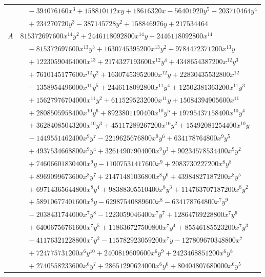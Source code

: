 \documentclass[11pt]{article}
\begin{document}
\begin{longtable}{@{}ll@{}}
 & $\quad -394076160x^{3}+158810112xy+18616320x-56401920y^{5}-203710464y^{4}$\\
 & $\quad +234270720y^{3}-387145728y^{2}+158846976y+217534464$\\
$A$ & $815372697600x^{14}y^{2}+2446118092800x^{14}y+2446118092800x^{14}$\\
 & $\quad -815372697600x^{13}y^{3}+1630745395200x^{13}y^{2}+9784472371200x^{13}y$\\
 & $\quad +12230590464000x^{13}+2174327193600x^{12}y^{4}+4348654387200x^{12}y^{3}$\\
 & $\quad +7610145177600x^{12}y^{2}+16307453952000x^{12}y+22830435532800x^{12}$\\
 & $\quad -1358954496000x^{11}y^{5}+2446118092800x^{11}y^{4}+12502381363200x^{11}y^{3}$\\
 & $\quad +15627976704000x^{11}y^{2}+6115295232000x^{11}y+15084394905600x^{11}$\\
 & $\quad +2808505958400x^{10}y^{6}+8923801190400x^{10}y^{5}+19795437158400x^{10}y^{4}$\\
 & $\quad +36284085043200x^{10}y^{3}+45117289267200x^{10}y^{2}+15492081254400x^{10}y$\\
 & $\quad -1449551462400x^{9}y^{7}-2219625676800x^{9}y^{6}+634178764800x^{9}y^{5}$\\
 & $\quad +4937534668800x^{9}y^{4}+32614907904000x^{9}y^{3}+90234578534400x^{9}y^{2}$\\
 & $\quad +74606601830400x^{9}y-11007531417600x^{9}+2083730227200x^{8}y^{8}$\\
 & $\quad +8969099673600x^{8}y^{7}+21471481036800x^{8}y^{6}+43984827187200x^{8}y^{5}$\\
 & $\quad +69714365644800x^{8}y^{4}+98388305510400x^{8}y^{3}+114763707187200x^{8}y^{2}$\\
 & $\quad +58910677401600x^{8}y-62987540889600x^{8}-634178764800x^{7}y^{9}$\\
 & $\quad -2038431744000x^{7}y^{8}-1223059046400x^{7}y^{7}+12864769228800x^{7}y^{6}$\\
 & $\quad +64006756761600x^{7}y^{5}+118636727500800x^{7}y^{4}+85546185523200x^{7}y^{3}$\\
 & $\quad -41176321228800x^{7}y^{2}-115782923059200x^{7}y-127809670348800x^{7}$\\
 & $\quad +724775731200x^{6}y^{10}+2400819609600x^{6}y^{9}+2423468851200x^{6}y^{8}$\\
 & $\quad +2740558233600x^{6}y^{7}+28651290624000x^{6}y^{6}+80404807680000x^{6}y^{5}$\\

\end{longtable}
\end{document}
